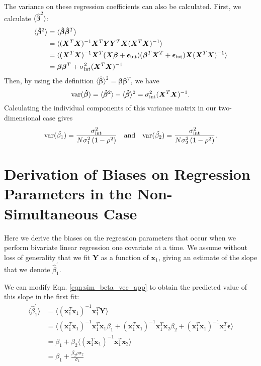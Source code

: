 The variance on these regression coefficients can also be calculated. First, we calculate $\langle\bm{\hat{\beta}}^2\rangle$:
\begin{align*}
    \langle\bm{\hat{\beta}}^2\rangle &= \langle\bm{\hat{\beta}}\bm{\hat{\beta}}^T\rangle \\
    &= \langle(\bm{X}^T\bm{X})^{-1}\bm{X}^T\bm{YY}^T\bm{X}(\bm{X}^T\bm{X})^{-1}\rangle \\
    &= \langle(\bm{X}^T\bm{X})^{-1}\bm{X}^T(\bm{X\beta}+\bm{\epsilon}_\text{int})(\bm{\beta}^T\bm{X}^T+\bm{\epsilon}_\text{int})\bm{X}(\bm{X}^T\bm{X})^{-1}\rangle\\
    &= \bm{\beta\beta}^T + \sigma_{\text{int}}^2(\bm{X}^T\bm{X})^{-1}
\end{align*}
Then, by using the definition $\langle\bm{\hat{\beta}}\rangle^2 = \bm{\beta\beta}^T$, we have$$\text{var}(\bm{\hat{\beta}})= \langle\bm{\hat{\beta}}^2\rangle-\langle\bm{\hat{\beta}}\rangle^2 = \sigma_{\text{int}}^2(\bm{X}^T\bm{X})^{-1}.$$
Calculating the individual components of this variance matrix in our two-dimensional case gives
\begin{equation}
    \text{var}(\hat{\beta_1})=\frac{\sigma_{\text{int}}^2}{N\sigma_1^2\left(1-\rho^2\right)}\quad\text{and}\quad\text{var}(\hat{\beta_2})=\frac{\sigma_{\text{int}}^2}{N\sigma_2^2\left(1-\rho^2\right)}.
    \label{eqn:var_betahat_simultaneous}
\end{equation}


\section{Derivation of Biases on Regression Parameters in the Non-Simultaneous Case}
\label{app:non_simultaneous_ols}
Here we derive the biases on the regression parameters that occur when we perform bivariate linear regression one covariate at a time. We assume without loss of generality that we fit $\bm{Y}$ as a function of $\bm{x}_1$, giving an estimate of the slope that we denote $\hat{\beta}_1^\prime$.

We can modify Eqn. \ref{eqn:sim_beta_vec_app} to obtain the predicted value of this slope in the first fit:
\begin{align*}
    \langle\hat{\beta}_1^\prime\rangle &= \langle(\bm{x}_1^T\bm{x}_1)^{-1}\bm{x}_1^T\bm{Y}\rangle\\
    &= \langle(\bm{x}_1^T\bm{x}_1)^{-1}\bm{x}_1^T\bm{x}_1\beta_1 + (\bm{x}_1^T\bm{x}_1)^{-1}\bm{x}_1^T\bm{x}_2\beta_2 + (\bm{x}_1^T\bm{x}_1)^{-1}\bm{x}_1^T\bm{\epsilon}\rangle\\
    &= \beta_1 + \beta_2\langle(\bm{x}_1^T\bm{x}_1)^{-1}\bm{x}_1^T\bm{x}_2\rangle\\
    &= \beta_1 + \frac{\beta_2\rho\sigma_2}{\sigma_1}
\end{align*}

